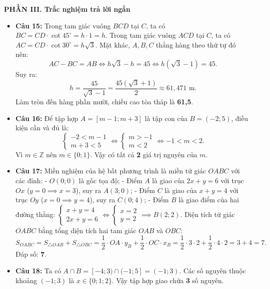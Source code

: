 \documentclass[12pt,a4paper]{article}
\begin{document}
\vspace{0.15cm}
\enlargethispage{2.5\baselineskip}
\textbf{\large PHẦN III. Trắc nghiệm trả lời ngắn}
\begin{itemize}[leftmargin=0.6cm, itemsep=4pt, topsep=1pt]
\item \textbf{Câu 15:} Trong tam giác vuông $BCD$ tại $C$, ta có $BC = CD \cdot \cot 45^\circ = h \cdot 1 = h$.
Trong tam giác vuông $ACD$ tại $C$, ta có $AC = CD \cdot \cot 30^\circ = h\sqrt{3}$.
Mặt khác, $A, B, C$ thẳng hàng theo thứ tự đó nên:
\[
AC - BC = AB \iff h\sqrt{3} - h = 45 \iff h(\sqrt{3} - 1) = 45.
\]
Suy ra:
\[
h = \dfrac{45}{\sqrt{3} - 1} = \dfrac{45(\sqrt{3} + 1)}{2} \approx 61{,}471\text{ m}.
\]
Làm tròn đến hàng phần mười, chiều cao tòa tháp là \textbf{61,5}.

\item \textbf{Câu 16:} Để tập hợp $A = [m - 1; m + 3]$ là tập con của $B = (-2; 5)$, điều kiện cần và đủ là:
\[
\begin{cases} -2 < m - 1 \\ m + 3 < 5 \end{cases} \iff \begin{cases} m > -1 \\ m < 2 \end{cases} \iff -1 < m < 2.
\]
Vì $m \in \mathbb{Z}$ nên $m \in \{0; 1\}$. Vậy có tất cả \textbf{2} giá trị nguyên của $m$.

\item \textbf{Câu 17:} Miền nghiệm của hệ bất phương trình là miền tứ giác $OABC$ với các đỉnh:
- $O(0; 0)$ là gốc tọa độ;
- Điểm $A$ là giao của $2x + y = 6$ với trục $Ox$ ($y = 0 \implies x = 3$), suy ra $A(3; 0)$;
- Điểm $C$ là giao của $x + y = 4$ với trục $Oy$ ($x = 0 \implies y = 4$), suy ra $C(0; 4)$;
- Điểm $B$ là giao điểm của hai đường thẳng: $\begin{cases} x + y = 4 \\ 2x + y = 6 \end{cases} \iff \begin{cases} x = 2 \\ y = 2 \end{cases} \implies B(2; 2)$.
Diện tích tứ giác $OABC$ bằng tổng diện tích hai tam giác $OAB$ và $OBC$:
\[
S_{OABC} = S_{\triangle OAB} + S_{\triangle OBC} = \dfrac{1}{2} \cdot OA \cdot y_B + \dfrac{1}{2} \cdot OC \cdot x_B = \dfrac{1}{2} \cdot 3 \cdot 2 + \dfrac{1}{2} \cdot 4 \cdot 2 = 3 + 4 = 7.
\]
Đáp số: \textbf{7}.

\item \textbf{Câu 18:} Ta có $A \cap B = [-4; 3) \cap (-1; 5] = (-1; 3)$.
Các số nguyên thuộc khoảng $(-1; 3)$ là $x \in \{0; 1; 2\}$. Vậy tập hợp giao chứa \textbf{3} số nguyên.
\end{itemize}
\end{document}
